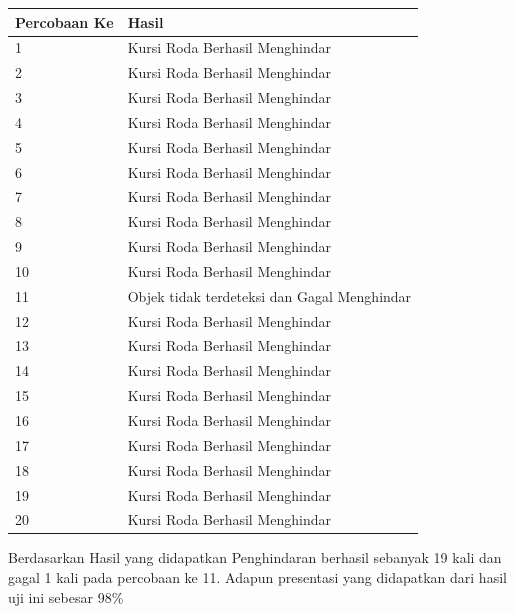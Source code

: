 \begin{table}[H]
\centering
\begin{tabular}{|l|l|}
\hline
Percobaan Ke & Hasil                                                               \\ \hline
1            & \cellcolor[HTML]{67FD9A}Kursi Roda Berhasil Menghindar              \\ \hline
2            & \cellcolor[HTML]{67FD9A}Kursi Roda Berhasil Menghindar              \\ \hline
3            & \cellcolor[HTML]{67FD9A}Kursi Roda Berhasil Menghindar              \\ \hline
4            & \cellcolor[HTML]{67FD9A}Kursi Roda Berhasil Menghindar              \\ \hline
5            & \cellcolor[HTML]{67FD9A}Kursi Roda Berhasil Menghindar              \\ \hline
6            & \cellcolor[HTML]{67FD9A}Kursi Roda Berhasil Menghindar              \\ \hline
7            & \cellcolor[HTML]{67FD9A}Kursi Roda Berhasil Menghindar              \\ \hline
8            & \cellcolor[HTML]{67FD9A}Kursi Roda Berhasil Menghindar              \\ \hline
9            & \cellcolor[HTML]{67FD9A}Kursi Roda Berhasil Menghindar              \\ \hline
10           & \cellcolor[HTML]{67FD9A}Kursi Roda Berhasil Menghindar              \\ \hline
11           & \cellcolor[HTML]{FD6864}Objek tidak terdeteksi dan Gagal Menghindar \\ \hline
12           & \cellcolor[HTML]{67FD9A}Kursi Roda Berhasil Menghindar              \\ \hline
13           & \cellcolor[HTML]{67FD9A}Kursi Roda Berhasil Menghindar              \\ \hline
14           & \cellcolor[HTML]{67FD9A}Kursi Roda Berhasil Menghindar              \\ \hline
15           & \cellcolor[HTML]{67FD9A}Kursi Roda Berhasil Menghindar              \\ \hline
16           & \cellcolor[HTML]{67FD9A}Kursi Roda Berhasil Menghindar              \\ \hline
17           & \cellcolor[HTML]{67FD9A}Kursi Roda Berhasil Menghindar              \\ \hline
18           & \cellcolor[HTML]{67FD9A}Kursi Roda Berhasil Menghindar              \\ \hline
19           & \cellcolor[HTML]{67FD9A}Kursi Roda Berhasil Menghindar              \\ \hline
20           & \cellcolor[HTML]{67FD9A}Kursi Roda Berhasil Menghindar              \\ \hline
\end{tabular}
\end{table}

Berdasarkan Hasil yang didapatkan Penghindaran berhasil sebanyak 19 kali dan gagal 1 kali pada percobaan ke 11. Adapun presentasi yang didapatkan dari hasil uji ini sebesar 98\%